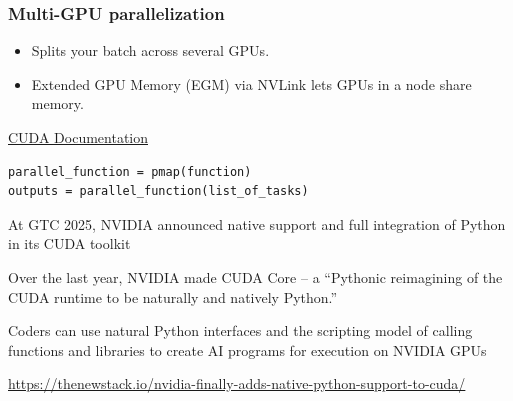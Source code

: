   \begin{frame}[fragile]
    \frametitle{Multi-GPU parallelization}
  
    \vspace{0.5em}
    \begin{itemize}
      \item Splits your batch across several GPUs.
      \item Extended GPU Memory 
      (EGM) via NVLink lets GPUs in a node share memory.
    \end{itemize}
    \begin{figure}
        \begin{center}
        \end{center}
     \end{figure}
     \footnotesize{
        \href{https://docs.nvidia.com/cuda/cuda-c-programming-guide/index.html?highlight=multiple%
    }{CUDA Documentation}}
    \vspace{0.5em}
    \begin{verbatim}
parallel_function = pmap(function)  
outputs = parallel_function(list_of_tasks)  
    \end{verbatim}
  \end{frame}

\begin{frame}

    \textbf{}
    
    \vspace{0.5em}
    At GTC 2025, NVIDIA announced native support and full integration of Python in its CUDA toolkit


    \vspace{0.5em}
    Over the last year, NVIDIA made CUDA Core -- a ``Pythonic
    reimagining of the CUDA runtime to be naturally and natively Python.''

    \vspace{0.5em}
    Coders can use natural Python interfaces and the scripting model of calling
    functions and libraries to create AI programs for execution on NVIDIA
    GPUs

    \vspace{0.5em}
    \vspace{0.5em}
    \vspace{0.5em}

    \footnotesize{
        \url{https://thenewstack.io/nvidia-finally-adds-native-python-support-to-cuda/}
    }

\end{frame}


